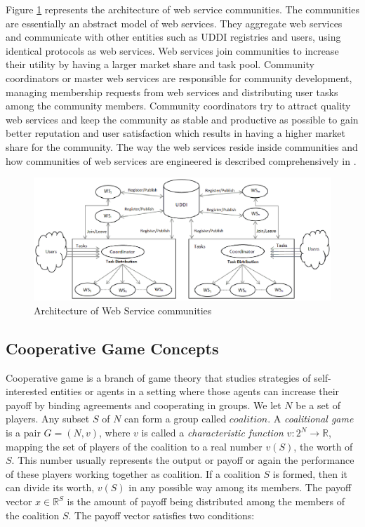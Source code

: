 \documentclass[10pt,journal,cspaper,compsoc]{IEEEtran}
\begin{document}
Figure \ref{fig_community} represents the architecture of web service communities. The communities are essentially an abstract model of web services. They aggregate web services and communicate with other entities such as UDDI registries and users, using identical protocols as web services. Web services join communities to increase their utility by having a larger market share and task pool. Community coordinators or master web services are responsible for community development, managing membership requests from web services and distributing user tasks among the community members. Community coordinators try to attract quality web services and keep the community as stable and productive as possible to gain better reputation and user satisfaction which results in having a higher market share for the community. The way the web services reside inside communities and how communities of web services are engineered is described comprehensively in \cite{DBLP:journals/ijebr/MaamarSTBB09}.

\begin{figure}[!t]
\centerline{\includegraphics[width=6.25in]{community.eps}}
\caption{Architecture of Web Service communities}
\label{fig_community}
\end{figure}

\subsection{Cooperative Game Concepts}
Cooperative game is a branch of game theory that studies
strategies of self-interested entities or agents in a setting
where those agents can increase their payoff by binding agreements
and cooperating in groups. We let $N$ be a set of players. Any
subset $S$ of $N$ can form a group called $coalition$. A
\emph{coalitional game} is a pair $G = (N, v)$, where $v$ is called
a \emph{characteristic function} $v: 2^N \to \mathbb{R}$, mapping the set of players of the
coalition to a real number $v(S)$, the worth of $S$. This number
usually represents the output or payoff or again the performance
of these players working together as coalition.  If a coalition
$S$ is formed, then it can divide its worth, $v(S)$ in any
possible way among its members. The payoff vector $x \in
\mathbb{R}^S$ is the amount of payoff being distributed among the
members of the coalition $S$. The payoff vector satisfies two
conditions:
\end{document}
